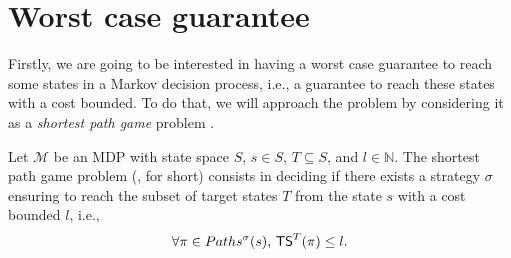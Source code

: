 \section{Worst case guarantee}
Firstly, we are going to be interested in having a worst case guarantee to reach some states in a Markov decision process, i.e., a guarantee to reach these states with a cost bounded.
To do that, we will approach the problem by considering it as a \textit{shortest path game} problem \cite{DBLP:journals/corr/RandourRS14a}.
\begin{definition}
  Let $\mathcal{M}$ be an MDP with state space $S$, $s \in S$, $T \subseteq S$, and $l \in \mathbb{N}$.
  The shortest path game problem (\SPG{}, for short) consists in deciding if there exists a strategy $\sigma$ ensuring to reach the subset of target states $T$ from the state $s$ with a cost bounded $l$, i.e.,
  \begin{align*}
    \forall \pi \in Paths^\sigma(s), \, \text{\sffamily TS}^T(\pi) \leq l.
  \end{align*}
\end{definition}

